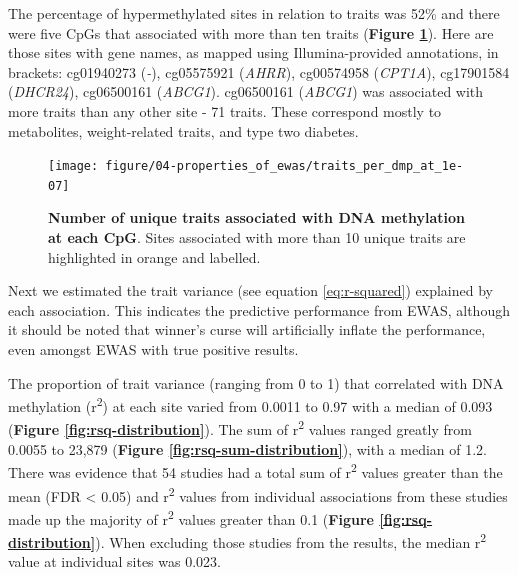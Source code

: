 \documentclass[11pt,oneside]{bristolthesis}
\begin{document}
The percentage of hypermethylated sites in relation to traits was 52\% and there were five CpGs that associated with more than ten traits (\textbf{Figure \ref{fig:traits-manhattan}}). Here are those sites with gene names, as mapped using Illumina-provided annotations, in brackets: cg01940273 (\emph{-}), cg05575921 (\emph{AHRR}), cg00574958 (\emph{CPT1A}), cg17901584 (\emph{DHCR24}), cg06500161 (\emph{ABCG1}). cg06500161 (\emph{ABCG1}) was associated with more traits than any other site - 71 traits. These correspond mostly to metabolites, weight-related traits, and type two diabetes.




\begin{figure}

{\centering \texttt{[image: figure/04-properties\_of\_ewas/traits\_per\_dmp\_at\_1e-07]} 

}

\caption[Number of unique traits associated with DNA methylation at each CpG]{\textbf{Number of unique traits associated with DNA methylation at each CpG}. Sites associated with more than 10 unique traits are highlighted in orange and labelled.}\label{fig:traits-manhattan}
\end{figure}
Next we estimated the trait variance (see equation \eqref{eq:r-squared}) explained by each association. This indicates the predictive performance from EWAS, although it should be noted that winner's curse will artificially inflate the performance, even amongst EWAS with true positive results.

The proportion of trait variance (ranging from 0 to 1) that correlated with DNA methylation (r\textsuperscript{2}) at each site varied from 0.0011 to 0.97 with a median of 0.093 (\textbf{Figure \ref{fig:rsq-distribution}}). The sum of r\textsuperscript{2} values ranged greatly from 0.0055 to 23,879 (\textbf{Figure \ref{fig:rsq-sum-distribution}}), with a median of 1.2. There was evidence that 54 studies had a total sum of r\textsuperscript{2} values greater than the mean (FDR \textless{} 0.05) and r\textsuperscript{2} values from individual associations from these studies made up the majority of r\textsuperscript{2} values greater than 0.1 (\textbf{Figure \ref{fig:rsq-distribution}}). When excluding those studies from the results, the median r\textsuperscript{2} value at individual sites was 0.023.
\end{document}
